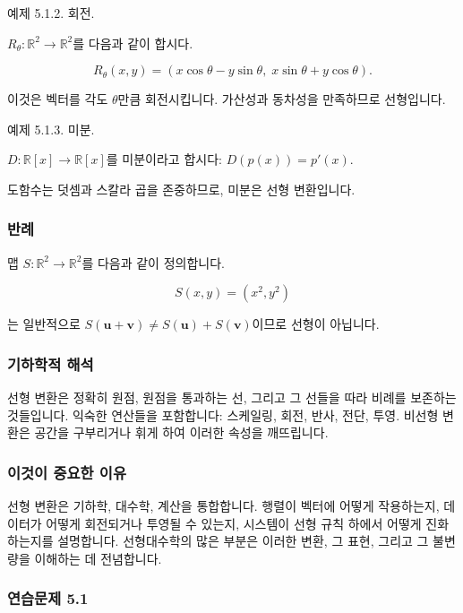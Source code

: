 \documentclass[
  12pt,
  a4paper,
]{article}
\begin{document}
예제 5.1.2. 회전.

\(R_\theta: \mathbb{R}^2 \to \mathbb{R}^2\)를 다음과 같이 합시다.

\[R_\theta(x,y) = (x\cos\theta - y\sin\theta, \; x\sin\theta + y\cos\theta).\]

이것은 벡터를 각도 \(\theta\)만큼 회전시킵니다. 가산성과 동차성을 만족하므로 선형입니다.

예제 5.1.3. 미분.

\(D: \mathbb{R}[x] \to \mathbb{R}[x]\)를 미분이라고 합시다: \(D(p(x)) = p'(x)\).

도함수는 덧셈과 스칼라 곱을 존중하므로, 미분은 선형 변환입니다.

\subsubsection{반례}\label{non-example}

맵 \(S:\mathbb{R}^2 \to \mathbb{R}^2\)를 다음과 같이 정의합니다.

\[S(x,y) = (x^2, y^2)\]

는 일반적으로 \(S(\mathbf{u} + \mathbf{v}) \neq S(\mathbf{u}) + S(\mathbf{v})\)이므로 선형이 아닙니다.

\subsubsection{기하학적 해석}\label{geometric-interpretation-8}

선형 변환은 정확히 원점, 원점을 통과하는 선, 그리고 그 선들을 따라 비례를 보존하는 것들입니다. 익숙한 연산들을 포함합니다: 스케일링, 회전, 반사, 전단, 투영. 비선형 변환은 공간을 구부리거나 휘게 하여 이러한 속성을 깨뜨립니다.

\subsubsection{이것이 중요한 이유}\label{why-this-matters-16}

선형 변환은 기하학, 대수학, 계산을 통합합니다. 행렬이 벡터에 어떻게 작용하는지, 데이터가 어떻게 회전되거나 투영될 수 있는지, 시스템이 선형 규칙 하에서 어떻게 진화하는지를 설명합니다. 선형대수학의 많은 부분은 이러한 변환, 그 표현, 그리고 그 불변량을 이해하는 데 전념합니다.

\subsubsection{연습문제 5.1}\label{exercises-51}
\end{document}
